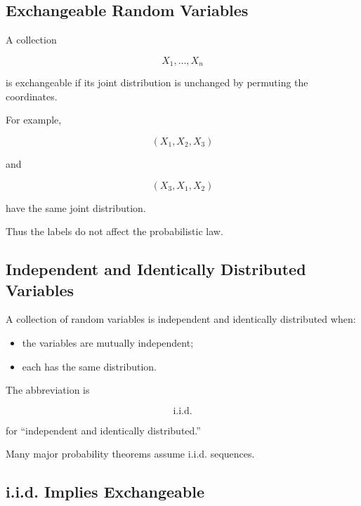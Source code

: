 \subsection{Exchangeable Random Variables}
\label{subsec:exchangeable-random-variables}

A collection

\[
X_1,\ldots,X_n
\]

is exchangeable if its joint distribution is unchanged by permuting the
coordinates.

For example,

\[
(X_1,X_2,X_3)
\]

and

\[
(X_3,X_1,X_2)
\]

have the same joint distribution.

Thus the labels do not affect the probabilistic law.

\subsection{Independent and Identically Distributed Variables}
\label{subsec:iid-random-variables}

A collection of random variables is independent and identically
distributed when:

\begin{itemize}
    \item the variables are mutually independent;
    \item each has the same distribution.
\end{itemize}

The abbreviation is

\[
\boxed{
\text{i.i.d.}
}
\]

for ``independent and identically distributed.''

Many major probability theorems assume i.i.d. sequences.

\subsection{i.i.d. Implies Exchangeable}
\label{subsec:iid-implies-exchangeable}

